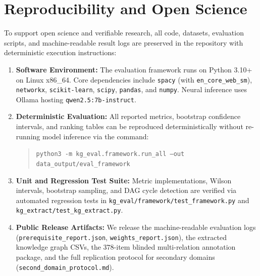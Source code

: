 \section{Reproducibility and Open Science}
\label{sec:reproducibility}

To support open science and verifiable research, all code, datasets, evaluation scripts, and machine-readable result logs are preserved in the repository with deterministic execution instructions:

\begin{enumerate}[leftmargin=*]
    \item \textbf{Software Environment:} The evaluation framework runs on Python 3.10+ on Linux x86\_64. Core dependencies include \texttt{spacy} (with \texttt{en\_core\_web\_sm}), \texttt{networkx}, \texttt{scikit-learn}, \texttt{scipy}, \texttt{pandas}, and \texttt{numpy}. Neural inference uses Ollama hosting \texttt{qwen2.5:7b-instruct}.
    \item \textbf{Deterministic Evaluation:} All reported metrics, bootstrap confidence intervals, and ranking tables can be reproduced deterministically without re-running model inference via the command:
    \begin{quote}
    \small \texttt{python3 -m kg\_eval.framework.run\_all --out data\_output/eval\_framework}
    \end{quote}
    \item \textbf{Unit and Regression Test Suite:} Metric implementations, Wilson intervals, bootstrap sampling, and DAG cycle detection are verified via automated regression tests in \texttt{kg\_eval/framework/test\_framework.py} and \texttt{kg\_extract/test\_kg\_extract.py}.
    \item \textbf{Public Release Artifacts:} We release the machine-readable evaluation logs (\texttt{prerequisite\_report.json}, \texttt{weights\_report.json}), the extracted knowledge graph CSVs, the $378$-item blinded multi-relation annotation package, and the full replication protocol for secondary domains (\texttt{second\_domain\_protocol.md}).
\end{enumerate}
